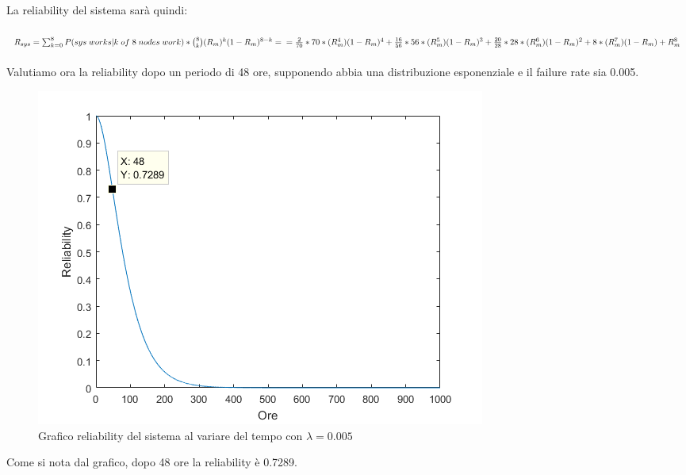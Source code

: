	 La reliability del sistema sarà quindi:\\\\
	 $ R_{sys}=\sum_{k=0}^{8}P(sys\;works|k\;of\;8\;nodes\;work)*\binom{8}{k}(R_{m})^{k}(1-R_{m})^{8-k}=\\\\
	 =\frac{2}{70}*70*(R_{m}^{4})(1-R_{m})^{4}+\frac{16}{56}*56*(R_{m}^{5})(1-R_{m})^{3}+\frac{20}{28}*28*(R_{m}^{6})(1-R_{m})^{2}+8*(R_{m}^{7})(1-R_{m})+R_{m}^{8} $\\\\
	 Valutiamo ora la reliability dopo un periodo di 48 ore, supponendo abbia una distribuzione esponenziale e il failure rate sia 0.005.
	
	\begin{figure}[H]
		\centering
		\includegraphics[scale=0.75]{./immagine/grafico_rel_es3.png}
		\caption{Grafico reliability del sistema al variare del tempo con $\lambda=0.005$ }
		\label{fig:grafico_rel_es3}
	\end{figure} 
	
	Come si nota dal grafico, dopo 48 ore la reliability è 0.7289.\\\\
	
